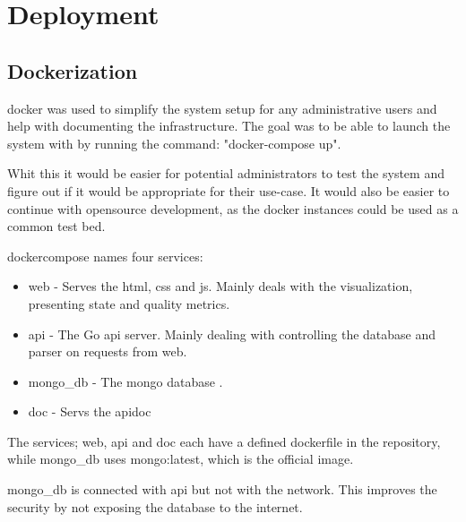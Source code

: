 
\chapter{Deployment}
\label{chap:deployment}

\section{Dockerization}

\Gls{docker} was used to simplify the system setup for any administrative users and help with documenting the infrastructure. The goal was to be able to launch the system with by running the command: "docker-compose up".

Whit this it would be easier for potential administrators to test the system and figure out if it would be appropriate for their use-case. It would also be easier to continue with \gls{opensource} development, as the \gls{docker} instances could be used as a common test bed. 

\Gls{dockercompose} names four services:
\begin{itemize}
    \item web - Serves the \gls{html}, \gls{css} and \gls{js}. Mainly deals with the visualization, presenting state and quality metrics.
    \item api - The Go \gls{api} server. Mainly dealing with controlling the database and parser on requests from web. 
    \item  mongo\_db - The \gls{mongo} database \cite{mongodb}.
    \item doc - Servs the \gls{apidoc} 
\end{itemize}

The services; web, api and doc each have a defined \gls{dockerfile} in the repository, while mongo\_db uses mongo:latest, which is the official image. 

mongo\_db is connected with api but not with the network. This improves the security by not exposing the database to the internet.

